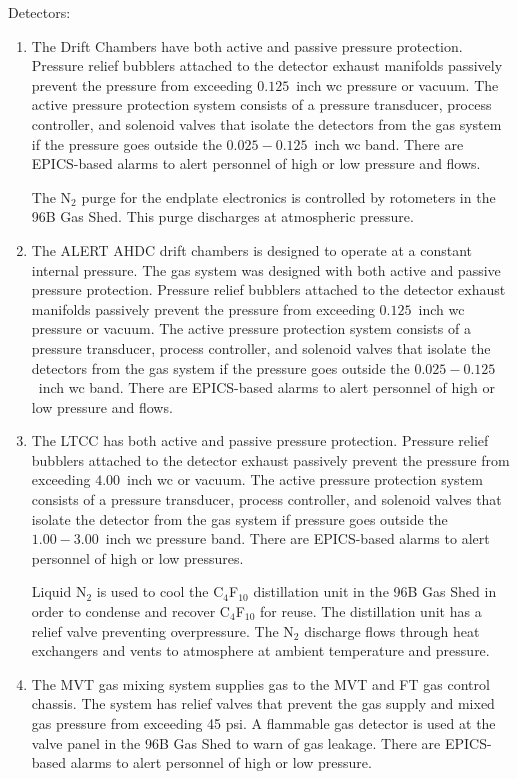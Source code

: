 \noindent
Detectors:
\begin{enumerate}
\item The Drift Chambers have both active and passive pressure protection. Pressure relief 
bubblers attached to the detector exhaust manifolds passively prevent the pressure from 
exceeding $0.125$~inch wc pressure or vacuum. The active pressure protection system consists 
of a pressure transducer, process controller, and solenoid valves that isolate the detectors 
from the gas system if the pressure goes outside the $0.025-0.125$~inch wc band. There are 
EPICS-based alarms to alert personnel of high or low pressure and flows.

The N$_2$ purge for the endplate electronics is controlled by rotometers in the 96B Gas Shed. 
This purge discharges at atmospheric pressure.

\item The ALERT AHDC drift chambers is designed to operate at a constant internal pressure. The
gas system was designed with both active and passive pressure protection. Pressure relief 
bubblers attached to the detector exhaust manifolds passively prevent the pressure from 
exceeding $0.125$~inch wc pressure or vacuum. The active pressure protection system consists 
of a pressure transducer, process controller, and solenoid valves that isolate the detectors 
from the gas system if the pressure goes outside the $0.025-0.125$~inch wc band. There are 
EPICS-based alarms to alert personnel of high or low pressure and flows.

\item The LTCC has both active and passive pressure protection. Pressure relief bubblers 
attached to the detector exhaust passively prevent the pressure from exceeding $4.00$~inch wc 
or vacuum. The active pressure protection system consists of a pressure transducer, process 
controller, and solenoid valves that isolate the detector from the gas system if pressure goes 
outside the $1.00 - 3.00$~inch wc pressure band. There are EPICS-based alarms to alert 
personnel of high or low pressures.
	
Liquid N$_2$ is used to cool the C$_4$F$_{10}$ distillation unit in the 96B Gas Shed in order 
to condense and recover C$_4$F$_{10}$ for reuse. The distillation unit has a relief valve 
preventing overpressure. The N$_2$ discharge flows through heat exchangers and vents to 
atmosphere at ambient temperature and pressure.

\item The MVT gas mixing system supplies gas to the MVT and FT gas control chassis. The system
has relief valves that prevent the gas supply and mixed gas pressure from exceeding 45 psi. A
flammable gas detector is used at the valve panel in the 96B Gas Shed to warn of gas leakage.
There are EPICS-based alarms to alert personnel of high or low pressure.
  

\end{enumerate}
